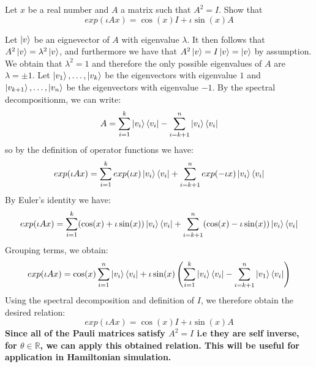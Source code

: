 \begin{example}
Let $x$ be a real number and $A$ a matrix such that $A^2=I$. Show that
\[
exp(\iota Ax)=\cos (x)I + \iota \sin(x) A
\]

Let $\ket{v}$ be an eignevector of $A$ with eigenvalue $\lambda$. It then follows that $A^2\ket{v}=\lambda^2\ket{v}$, and furthermore we have that $A^2 \ket{v}=I\ket{v}=\ket{v}$ by assumption. We obtain that $\lambda^2= 1$ and therefore the only possible eigenvalues of $A$ are $\lambda=\pm 1$. Let $\ket{v_1},\ldots,\ket{v_k}$ be the eigenvectors with eigenvalue $1$ and $\ket{v_{k+1}},\ldots,\ket{v_n}$ be the eigenvectors with eigenvalue $-1$. By the spectral decompositionm, we can write:
\[
A=\sum_{i=1}^k \ket{v_i}\bra{v_i} - \sum_{i=k+1}^n \ket{v_i}\bra{v_i}
\]
so by the definition of operator functions we have:
\[
exp(\iota Ax)=\sum_{i=1}^k exp(\iota x)\ket{v_i}\bra{v_i} + \sum_{i=k+1}^n exp(-\iota x) \ket{v_i}\bra{v_i}
\]
By Euler's identity we have:
\[
exp(\iota Ax)=\sum_{i=1}^k (\cos(x)+\iota\sin(x))\ket{v_i}\bra{v_i} + \sum_{i=k+1}^n (\cos(x)-\iota \sin(x))\ket{v_i}\bra{v_i}
\]
Grouping terms, we obtain:
\[
exp(\iota Ax)=\cos(x) \sum_{i=1}^n \ket{v_i}\bra{v_i} + \iota \sin(x)\left(\sum_{i=1}^k \ket{v_i}\bra{v_i}-\sum_{i=k+1}^n \ket{v_1}\bra{v_i}\right)
\]
Using the spectral decomposition and definition of $I$, we therefore obtain the desired relation:
\[
exp(\iota Ax)=\cos(x)I+\iota\sin(x)A
\]
\textbf{Since all of the Pauli matrices satisfy $A^2=I$ i.e they are self inverse, for $\theta\in\mathbb{R}$, we can apply this obtained relation. This will be useful for application in Hamiltonian simulation.}
\end{example}
